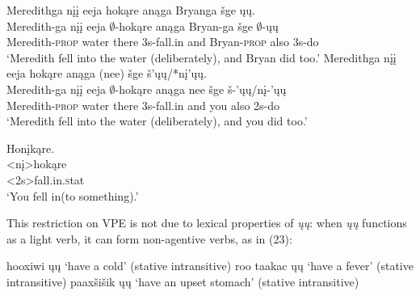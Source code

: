 \documentclass[output=paper]{LSP/langsci}
\begin{document}
\begin{exe}
\ex
\begin{xlist}
\ex
\glll Meredithga nįį eeja hokąre anąga Bryanga šge ųų.\\
Meredith-ga nįį eeja $\emptyset$-hokąre anąga Bryan-ga šge $\emptyset$-ųų\\
Meredith-\textsc{prop} water there {\textsc 3s}-fall.in and Bryan-\textsc{prop} also {\textsc 3s}-do\\
\trans `Meredith fell into the water (deliberately), and Bryan did too.'
\ex
\glll Meredithga nįį eeja hokąre anąga (nee) šge š'ųų/*nį'ųų.\\
Meredith-ga nįį eeja $\emptyset$-hokąre anąga nee šge š-'ųų/nį-'ųų\\
Meredith-\textsc{prop} water there {\textsc 3s}-fall.in and you also {\textsc 2s}-do\\
\trans `Meredith fell into the water (deliberately), and you did too.'
\end{xlist}
\end{exe}

\begin{exe}
\ex
\glll Honįkąre.\\
<nį>hokąre\\
<{\textsc 2s}>fall.in.{\textsc stat}\\
\trans `You fell in(to something).' \citep{Hartmann2012}
\end{exe}
	
This restriction on VPE is not due to lexical properties of \emph{ųų}: when \emph{ųų} functions as a light verb, it can form non-agentive verbs, as in (23):


\begin{singlespacing}
\begin{exe}
\ex
\begin{xlist}
\ex
hooxiwi ųų `have a cold' (stative intransitive)
\vspace{12pt}
\ex
roo taakac ųų `have a fever' (stative intransitive)
\vspace{12pt}
\ex
paaxšišik ųų `have an upset stomach' (stative intransitive)\\
\citep{Hartmann2012}
\end{xlist}
\end{exe}
\end{singlespacing}
\end{document}
